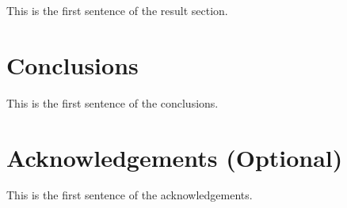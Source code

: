 \documentclass{madrid15WS}
\begin{document}
This is the first sentence of the result section.


\section{Conclusions}

This is the first sentence of the conclusions.

\section{Acknowledgements (Optional)}

This is the first sentence of the acknowledgements.

%
%
% 
\end{document}
